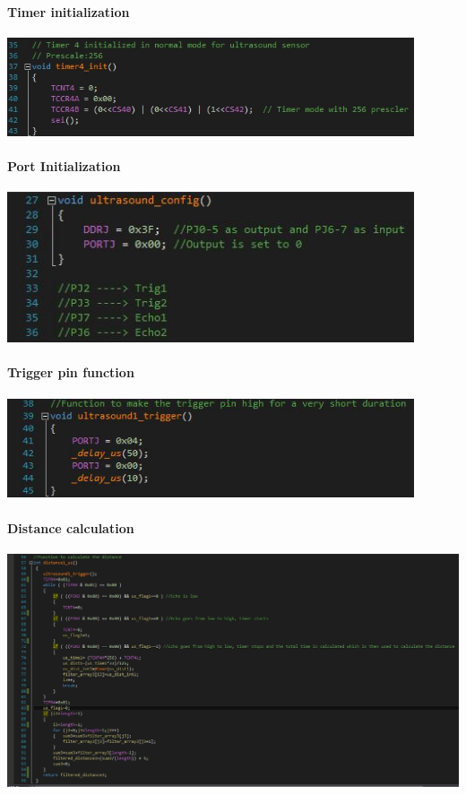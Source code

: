 \documentclass[12pt]{article}
\begin{document}
\paragraph{Timer initialization} 
\begin{center}
\includegraphics[width=0.9\textwidth]{10.jpg}
\end{center}

\paragraph{Port Initialization}
\begin{center}
\includegraphics[width=0.9\textwidth]{11.jpg}
\end{center}

\paragraph{Trigger pin function}
\begin{center}
\includegraphics[width=0.9\textwidth]{12.jpg}
\end{center}

\newpage
  
\paragraph{Distance calculation}
\begin{center}
\includegraphics[width=1.0\textwidth]{13.jpg}
\end{center} 
\end{document}

